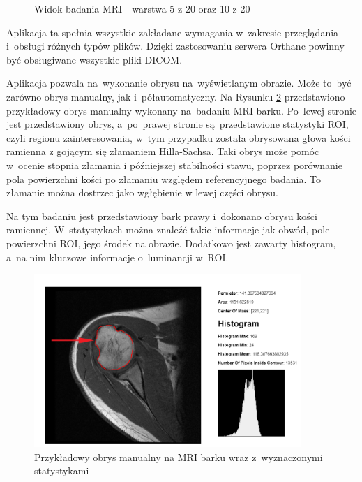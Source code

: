 \documentclass[a4paper,11pt,twoside,openright]{report}
\theoremstyle{definition}
\begin{document}
\begin{figure}[h!]
\begin{center}
\begin{center}
	\end{center}
	\endminipage\hfill
	\caption{Widok badania MRI - warstwa 5 z 20 oraz 10 z 20}
	\label{fig:140}
\end{center}
\end{figure}

Aplikacja ta spełnia wszystkie zakładane wymagania w~zakresie przeglądania i~obsługi różnych typów plików.
Dzięki zastosowaniu serwera Orthanc powinny być obsługiwane wszystkie pliki DICOM.

Aplikacja pozwala na~wykonanie obrysu na~wyświetlanym obrazie. Może to~być zarówno obrys
manualny, jak i~półautomatyczny. Na Rysunku \ref{fig:105} przedstawiono przykładowy obrys manualny
wykonany na~badaniu MRI barku. Po~lewej stronie jest przedstawiony obrys, a~po~prawej
stronie są~przedstawione statystyki ROI, czyli regionu zainteresowania, w~tym przypadku
została obrysowana głowa kości ramienna z gojącym się złamaniem Hilla-Sachsa. Taki obrys może pomóc w~ocenie
stopnia złamania i późniejszej stabilności stawu, poprzez porównanie pola powierzchni kości po złamaniu
względem referencyjnego badania. To złamanie można dostrzec jako wgłębienie w lewej części obrysu.

Na tym badaniu jest przedstawiony bark prawy i~dokonano obrysu kości ramiennej. W~statystykach można
znaleźć takie informacje jak obwód, pole powierzchni ROI, jego środek na obrazie. Dodatkowo jest zawarty
histogram, a~na nim kluczowe informacje o~luminancji w~ROI.

\pagebreak

\begin{figure}[h!]
	\center
	\includegraphics[width=0.9\textwidth]{105b}
	\caption{Przykładowy obrys manualny na MRI barku wraz z~wyznaczonymi statystykami}
    	\label{fig:105}
\end{figure}
\end{document}
